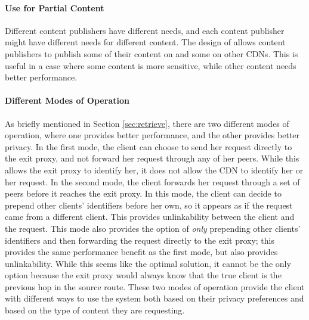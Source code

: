 \paragraph{Use \system{} for Partial Content} Different content publishers have different needs, and each content publisher might 
have different needs for different content.  The design of \system{} allows content publishers to publish some of their content 
on \system{} and some on other CDNs.  This is useful in a case where some content is more sensitive, while other content needs better 
performance.  

\paragraph{Different Modes of Operation}  As briefly mentioned in Section \ref{sec:retrieve}, there are two different modes of 
operation, where one provides better performance, and the other provides better privacy.  In the first mode, the client 
can choose to send her request directly to the exit proxy, and not forward her request through any of her peers.  While this 
allows the exit proxy to identify her, it does not allow the CDN to identify her or her request.  In the second mode, the 
client forwards her request through a set of peers before it reaches the exit proxy.  In this mode, the client can decide to 
prepend other clients' identifiers before her own, so it appears as if the request came from a different client.  This 
provides unlinkability between the client and the request.  This mode also provides the option of {\it only} prepending other clients' 
identifiers and then forwarding the request directly to the exit proxy; this provides the same performance benefit as the first mode, 
but also provides unlinkability.  While this seems like the optimal solution, it cannot be the only option because the exit proxy 
would always know that the true client is the previous hop in the source route.  These two modes of operation provide the client 
with different ways to use the system both based on their privacy preferences and based on the type of content they are requesting.
